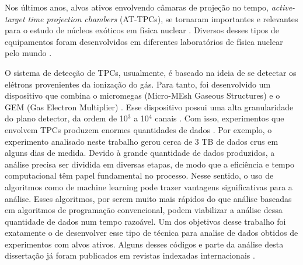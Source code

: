 \documentclass[a4paper,12pt,oneside]{book}
\begin{document}



\par Nos últimos anos, alvos ativos envolvendo câmaras de projeção no tempo, \textit{active-target time projection chambers} (AT-TPCs), se tornaram importantes e relevantes para o estudo de núcleos exóticos em física nuclear \cite{FORTINO2022166497}. Diversos desses tipos de equipamentos foram desenvolvidos em diferentes laboratórios de física nuclear pelo mundo \cite{attpc, FURUNO2018215, KOSHCHIY2020163398}.

\par O sistema de detecção de TPCs, usualmente, é baseado na ideia de se detectar os elétrons provenientes da ionização do gás. Para tanto, foi desenvolvido um dispositivo que combina o micromegas (Micro-MEsh Gaseous Structures) \cite{micromegas} e o GEM (Gas Electron Multiplier) \cite{GET}. Esse dispositivo possui uma alta granularidade do plano detector, da ordem de 10$^3$ a 10$^4$ canais \cite{FORTINO2022166497}. Com isso, experimentos que envolvem TPCs produzem enormes quantidades de dados \cite{attpc, pattpc}. Por exemplo, o experimento analisado neste trabalho gerou cerca de 3 TB de dados crus em alguns dias de medida. Devido à grande quantidade de dados produzidos, a análise precisa ser dividida em diversas etapas, de modo que a eficiência e tempo computacional têm papel fundamental no processo. Nesse sentido, o uso de algoritmos como de machine learning pode trazer vantagens significativas para a análise. Esses algoritmos, por serem muito mais rápidos do que análise baseadas em algoritmos de programação convencional, podem viabilizar a análise dessa quantidade de dados num tempo razoável. Um dos objetivos desse trabalho foi exatamente o de desenvolver esse tipo de técnica para analise de dados obtidos de experimentos com alvos ativos. Alguns desses códigos e parte da análise desta dissertação já foram publicados em revistas indexadas internacionais \cite{FORTINO2022166497, artigo}.

\end{document}
